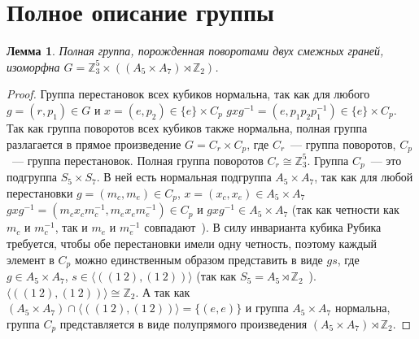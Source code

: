 \documentclass[utf8,a4paper,12pt]{article}
\newtheorem{lemma_cub}{Лемма}[section]
\begin{document}
\section{Полное описание группы}
\begin{lemma_cub}
Полная группа, порожденная поворотами двух смежных граней, изоморфна $G=\mathbb{Z}_3^5\times ((A_5\times A_7)\rtimes\mathbb{Z}_2)$.
\end{lemma_cub}
\begin{proof}
Группа перестановок всех кубиков нормальна, так как для любого $g=(r,p_1)\in G$ и $x=(e,p_2)\in \{e\}\times C_p$ $gxg^{-1}=(e,p_1p_2p_1^{-1})\in \{e\}\times C_p$. Так как группа поворотов всех кубиков также нормальна, полная группа разлагается в прямое произведение $G=C_r\times C_p$, где $C_r$~--- группа поворотов, $C_p$~--- группа перестановок. Полная группа поворотов $C_r\cong \mathbb{Z}_3^5$. Группа $C_p$~--- это подгруппа $S_5\times S_7$. В ней есть нормальная подгруппа $A_5\times A_7$, так как для любой перестановки $g=(m_c,m_e)\in C_p$, $x=(x_c,x_e)\in A_5\times A_7$ $gxg^{-1}=(m_cx_cm_c^{-1},m_ex_em_e^{-1})\in C_p$ и $gxg^{-1}\in A_5\times A_7$ (так как четности как $m_c$ и $m_c^{-1}$, так и $m_e$ и $m_e^{-1}$ совпадают~\cite{alexeev}). В силу инварианта кубика Рубика требуется, чтобы обе перестановки имели одну четность, поэтому каждый элемент в $C_p$ можно единственным образом представить в виде $gs$, где $g\in A_5\times A_7$, $s\in \langle((1~2),(1~2))\rangle$ (так как $S_5=A_5\rtimes\mathbb{Z}_2$~\cite{vinberg}). $\langle((1~2),(1~2))\rangle\cong\mathbb{Z}_2$. А так как $(A_5\times A_7)\cap \langle((1~2),(1~2))\rangle=\{(e,e)\}$ и группа $A_5\times A_7$ нормальна, группа $C_p$ представляется в виде полупрямого произведения $(A_5\times A_7)\rtimes\mathbb{Z}_2$.
\end{proof}
{}

\end{document}
